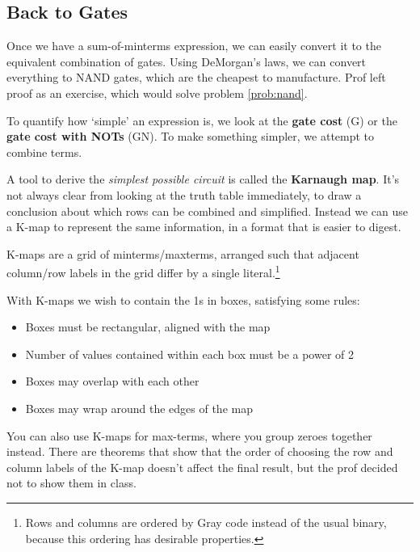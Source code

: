 \subsection{Back to Gates}

Once we have a sum-of-minterms expression, we can easily convert it to the equivalent combination of gates. Using DeMorgan's laws, we can convert everything to NAND gates, which are the cheapest to manufacture. Prof left proof as an exercise, which would solve problem \ref{prob:nand}.

To quantify how `simple' an expression is, we look at the \textbf{gate cost} (G) or the \textbf{gate cost with NOTs} (GN). To make something simpler, we attempt to combine terms.

A tool to derive the \textit{simplest possible circuit} is called the \textbf{Karnaugh map}. It's not always clear from looking at the truth table immediately, to draw a conclusion about which rows can be combined and simplified. Instead we can use a K-map to represent the same information, in a format that is easier to digest.

\begin{definition}
    K-maps are a grid of minterms/maxterms, arranged such that adjacent column/row labels in the grid differ by a single literal.\footnote{Rows and columns are ordered by Gray code instead of the usual binary, because this ordering has desirable properties.}
\end{definition}

\noindent With K-maps we wish to contain the 1s in boxes, satisfying some rules:
\begin{itemize}
\item Boxes must be rectangular, aligned with the map
\item Number of values contained within each box must be a power of 2
\item Boxes may overlap with each other
\item Boxes may wrap around the edges of the map
\end{itemize}

You can also use K-maps for max-terms, where you group zeroes together instead. There are theorems that show that the order of choosing the row and column labels of the K-map doesn't affect the final result, but the prof decided not to show them in class.
